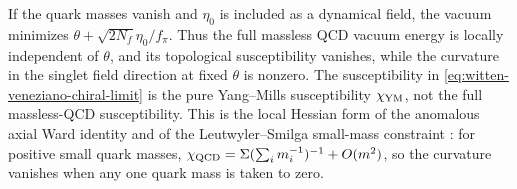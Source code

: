 \begin{remark}
\label{rem:massless-quark-theta-independence-wv}
If the quark masses vanish and \(\eta_0\) is included as a dynamical field,
the vacuum minimizes
\(
\theta+\sqrt{2N_f}\eta_0/f_\pi
\).
Thus the full massless QCD vacuum energy is locally independent of
\(\theta\), and its topological susceptibility vanishes, while the curvature
in the singlet field direction at fixed \(\theta\) is nonzero.  The
susceptibility in \eqref{eq:witten-veneziano-chiral-limit} is the pure
Yang--Mills susceptibility \(\chi_{\rm YM}\), not the full massless-QCD
susceptibility.  This is the local Hessian form of the anomalous axial Ward
identity and of the Leutwyler--Smilga small-mass constraint
\cite{LeutwylerSmilga1992}: for positive small quark masses,
\(\chi_{\rm QCD}=\Sigma(\sum_i m_i^{-1})^{-1}+O(m^2)\), so the curvature
vanishes when any one quark mass is taken to zero.
\end{remark}

